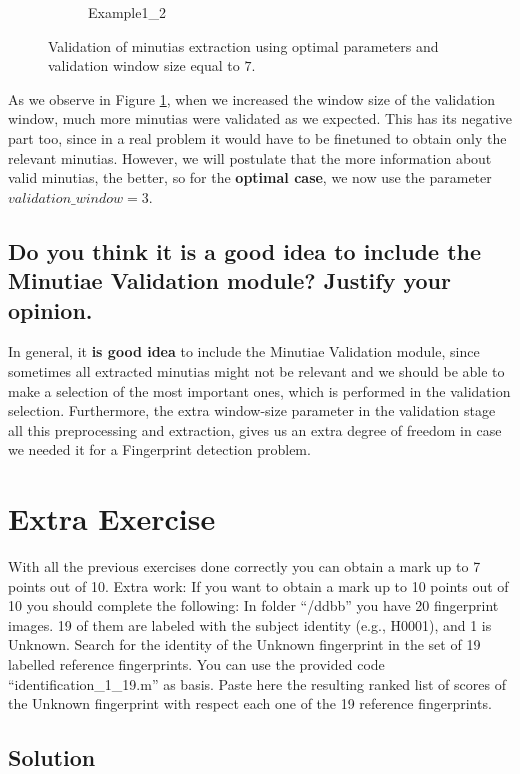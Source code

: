 \documentclass[a4paper]{article}
\begin{document}
\begin{figure}[H]
\begin{subfigure}[t]{0.45\textwidth}
         \caption{Example1\_2}
     \end{subfigure}
    \caption{Validation of minutias extraction using optimal parameters and validation window size equal to \(7\).}
    \label{fig:ex6bval7}
\end{figure}

As we observe in Figure \ref{fig:ex6bval7}, when we increased the window size of the validation window, much more minutias were validated as we expected. This has its negative part too, since in a real problem it would have to be finetuned to obtain only the relevant minutias.  However, we will postulate that the more information about valid minutias, the better, so for the \textbf{optimal case}, we now use the parameter  \(validation\_window = 3\).


\subsection{ Do you think it is a good idea to include the Minutiae Validation module? Justify your opinion. }

In general, it \textbf{is good idea} to include the Minutiae Validation module, since sometimes all extracted minutias might not be relevant and we should be able to make a selection of the most important ones, which is performed in the validation selection. Furthermore, the extra window-size parameter in the validation stage all this preprocessing and extraction, gives us an extra degree of freedom in case we needed it for a Fingerprint detection problem.


\section{Extra Exercise}
With all the previous exercises done correctly you can obtain a mark up to 7 points out of 10. 
Extra work: If you want to obtain a mark up to 10 points out of 10 you should complete the following:
In folder “/ddbb” you have 20 fingerprint images. 19 of them are labeled with the subject identity (e.g., H0001), and 1 is Unknown. Search for the identity of the Unknown fingerprint in the set of 19 labelled reference fingerprints. You can use the provided code “identification\_1\_19.m” as basis. Paste here the resulting ranked list of scores of the Unknown fingerprint with respect each one of the 19 reference fingerprints.

\subsection{Solution}
\end{document}
